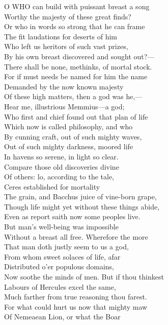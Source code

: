 O WHO can build with puissant breast a song\\
Worthy the majesty of these great finds?\\
Or who in words so strong that he can frame\\
The fit laudations for deserts of him\\
Who left us heritors of such vast prizes,\\
By his own breast discovered and sought out?—\\
There shall be none, methinks, of mortal stock.\\
For if must needs be named for him the name\\
Demanded by the now known majesty\\
Of these high matters, then a god was he,—\\
Hear me, illustrious Memmius—a god;\\
Who first and chief found out that plan of life\\
Which now is called philosophy, and who\\
By cunning craft, out of such mighty waves,\\
Out of such mighty darkness, moored life\\
In havens so serene, in light so clear.\\
Compare those old discoveries divine\\
Of others: lo, according to the tale,\\
Ceres established for mortality\\
The grain, and Bacchus juice of vine-born grape,\\
Though life might yet without these things abide,\\
Even as report saith now some peoples live.\\
But man's well-being was impossible\\
Without a breast all free. Wherefore the more\\
That man doth justly seem to us a god,\\
From whom sweet solaces of life, afar\\
Distributed o'er populous domains,\\
Now soothe the minds of men. But if thou thinkest\\
Labours of Hercules excel the same,\\
Much farther from true reasoning thou farest.\\
For what could hurt us now that mighty maw\\
Of Nemeaean Lion, or what the Boar\\
